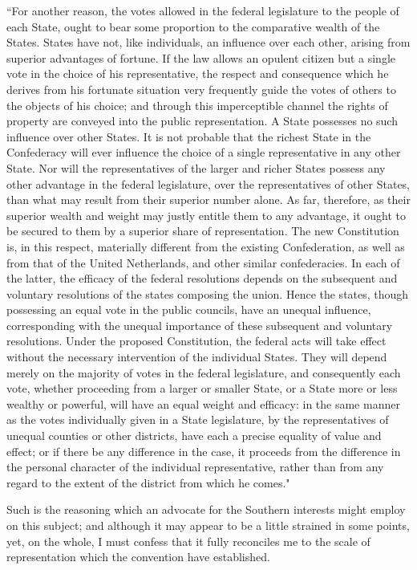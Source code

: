 ``For another reason, the votes allowed in the federal legislature to the people of each State, ought to bear some proportion to the comparative wealth of the States. 
States have not, like individuals, an influence over each other, arising from superior advantages of fortune. 
If the law allows an opulent citizen but a single vote in the choice of his representative, the respect and consequence which he derives from his fortunate situation very frequently guide the votes of others to the objects of his choice; and through this imperceptible channel the rights of property are conveyed into the public representation. 
A State possesses no such influence over other States. 
It is not probable that the richest State in the Confederacy will ever influence the choice of a single representative in any other State. 
Nor will the representatives of the larger and richer States possess any other advantage in the federal legislature, over the representatives of other States, than what may result from their superior number alone. 
As far, therefore, as their superior wealth and weight may justly entitle them to any advantage, it ought to be secured to them by a superior share of representation. 
The new Constitution is, in this respect, materially different from the existing Confederation, as well as from that of the United Netherlands, and other similar confederacies. 
In each of the latter, the efficacy of the federal resolutions depends on the subsequent and voluntary resolutions of the states composing the union. 
Hence the states, though possessing an equal vote in the public councils, have an unequal influence, corresponding with the unequal importance of these subsequent and voluntary resolutions. 
Under the proposed Constitution, the federal acts will take effect without the necessary intervention of the individual States. 
They will depend merely on the majority of votes in the federal legislature, and consequently each vote, whether proceeding from a larger or smaller State, or a State more or less wealthy or powerful, will have an equal weight and efficacy: in the same manner as the votes individually given in a State legislature, by the representatives of unequal counties or other districts, have each a precise equality of value and effect; or if there be any difference in the case, it proceeds from the difference in the personal character of the individual representative, rather than from any regard to the extent of the district from which he comes."

Such is the reasoning which an advocate for the Southern interests might employ on this subject; and although it may appear to be a little strained in some points, yet, on the whole, I must confess that it fully reconciles me to the scale of representation which the convention have established.


